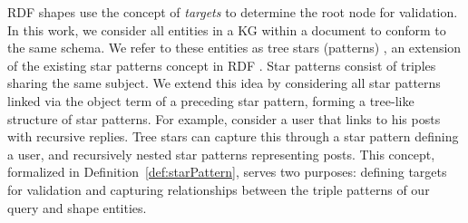 RDF shapes use the concept of \emph{targets} to determine the root node for validation.
In this work, we consider all entities in a KG within a document to conform to the same schema.
We refer to these entities as tree stars (patterns) , an extension of the existing star patterns concept in RDF .
Star patterns consist of triples sharing the same subject.
We extend this idea by considering all star patterns linked via the object term of a preceding star pattern, forming a tree-like structure of star patterns.
For example, consider a user that links to his posts with recursive replies.
Tree stars can capture this through a star pattern defining a user, and recursively nested star patterns representing posts.
This concept, formalized in Definition~\ref{def:starPattern}, serves two purposes: defining targets for validation and capturing relationships between the triple patterns of our query and shape entities.

